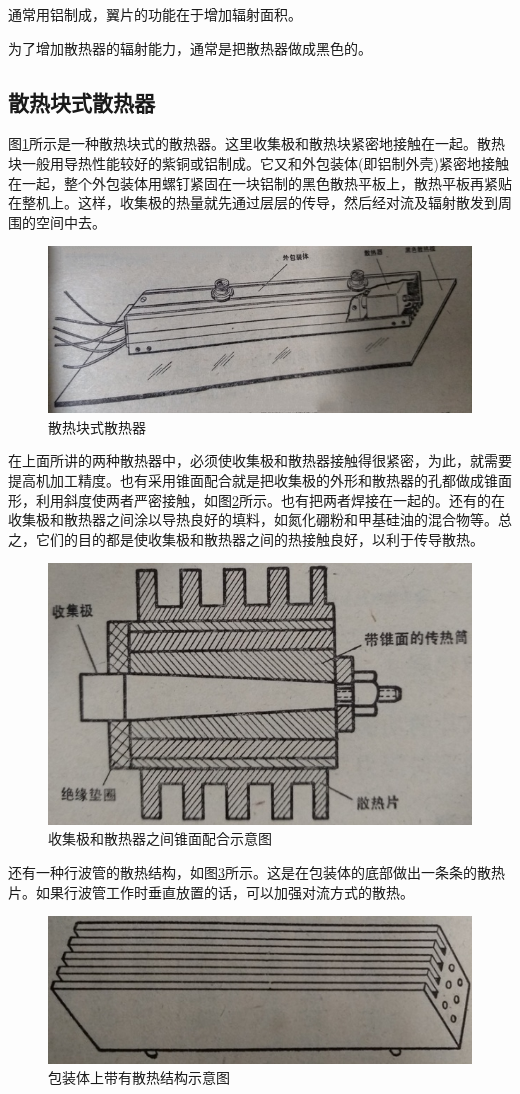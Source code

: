 通常用铝制成，翼片的功能在于增加辐射面积。


为了增加散热器的辐射能力，通常是把散热器做成黑色的。
\subsection{散热块式散热器}

图\ref{ch8-2}所示是一种散热块式的散热器。这里收集极和散热块紧密地接触在一起。散热块一般用导热性能较好的紫铜或铝制成。它又和外包装体(即铝制外壳)紧密地接触在一起，整个外包装体用螺钉紧固在一块铝制的黑色散热平板上，散热平板再紧贴在整机上。这样，收集极的热量就先通过层层的传导，然后经对流及辐射散发到周围的空间中去。
\begin{figure}[phtb]
	\centering
	\includegraphics[width=0.75\linewidth]{figure/ch8-2}
	\caption{ 散热块式散热器}
	\label{ch8-2}
\end{figure}

在上面所讲的两种散热器中，必须使收集极和散热器接触得很紧密，为此，就需要提高机加工精度。也有采用锥面配合就是把收集极的外形和散热器的孔都做成锥面形，利用斜度使两者严密接触，如图\ref{ch8-3}所示。也有把两者焊接在一起的。还有的在收集极和散热器之间涂以导热良好的填料，如氮化硼粉和甲基硅油的混合物等。总之，它们的目的都是使收集极和散热器之间的热接触良好，以利于传导散热。
\begin{figure}[phtb]
	\centering
	\includegraphics[width=0.55\linewidth]{figure/ch8-3}
	\caption{收集极和散热器之间锥面配合示意图}
	\label{ch8-3}
\end{figure}

还有一种行波管的散热结构，如图\ref{ch8-4}所示。这是在包装体的底部做出一条条的散热片。如果行波管工作时垂直放置的话，可以加强对流方式的散热。
\begin{figure}[phtb]
	\centering
	\includegraphics[width=0.55\linewidth]{figure/ch8-4}
	\caption{ 包装体上带有散热结构示意图}
	\label{ch8-4}
\end{figure}

